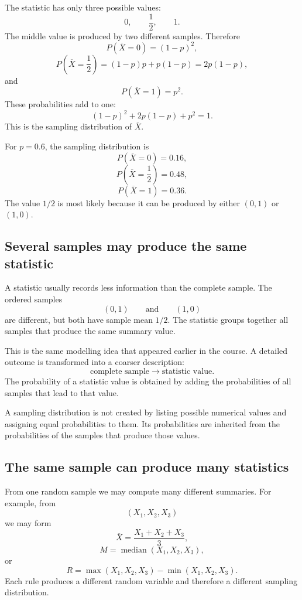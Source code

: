 The statistic has only three possible values:
\[
0,\qquad \frac12,\qquad 1.
\]
The middle value is produced by two different samples. Therefore
\[
P(\overline X=0)=(1-p)^2,
\]
\[
P\left(\overline X=\frac12\right)
=(1-p)p+p(1-p)=2p(1-p),
\]
and
\[
P(\overline X=1)=p^2.
\]
These probabilities add to one:
\[
(1-p)^2+2p(1-p)+p^2=1.
\]
This is the sampling distribution of \(\overline X\).

\begin{examplebox}
For \(p=0.6\), the sampling distribution is
\[
P(\overline X=0)=0.16,
\]
\[
P\left(\overline X=\frac12\right)=0.48,
\]
\[
P(\overline X=1)=0.36.
\]
The value \(1/2\) is most likely because it can be produced by either \((0,1)\)
or \((1,0)\).
\end{examplebox}

\subsection*{Several samples may produce the same statistic}

A statistic usually records less information than the complete sample. The
ordered samples
\[
(0,1)
\qquad\text{and}\qquad
(1,0)
\]
are different, but both have sample mean \(1/2\). The statistic groups together
all samples that produce the same summary value.

This is the same modelling idea that appeared earlier in the course. A detailed
outcome is transformed into a coarser description:
\[
\text{complete sample}
\longrightarrow
\text{statistic value}.
\]
The probability of a statistic value is obtained by adding the probabilities of
all samples that lead to that value.

\begin{remarkbox}
A sampling distribution is not created by listing possible numerical values and
assigning equal probabilities to them. Its probabilities are inherited from the
probabilities of the samples that produce those values.
\end{remarkbox}

\subsection*{The same sample can produce many statistics}

From one random sample we may compute many different summaries. For example,
from
\[
(X_1,X_2,X_3)
\]
we may form
\[
\overline X=\frac{X_1+X_2+X_3}{3},
\]
\[
M=\operatorname{median}(X_1,X_2,X_3),
\]
or
\[
R=\max(X_1,X_2,X_3)-\min(X_1,X_2,X_3).
\]
Each rule produces a different random variable and therefore a different
sampling distribution.

